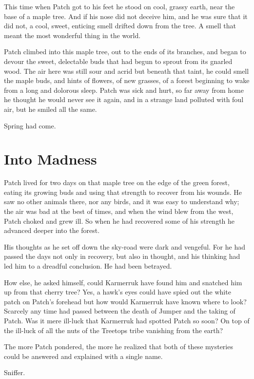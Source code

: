 \documentclass[12pt]{book}
\begin{document}
This time when Patch got to his feet he stood on cool, grassy earth, near the base of a maple tree. And if his nose did not deceive him, and he was sure that it did not, a cool, sweet, enticing smell drifted down from the tree. A smell that meant the most wonderful thing in the world.

Patch climbed into this maple tree, out to the ends of its branches, and began to devour the sweet, delectable buds that had begun to sprout from its gnarled wood. The air here was still sour and acrid %
but beneath that taint, he could smell the maple buds, and hints of flowers, of new grasses, of a forest beginning to wake from a long and dolorous sleep. Patch was sick and hurt, so far away from home he thought he would never see it again, and in a strange land polluted with foul air, but he smiled all the same.

Spring had come.


\section{Into Madness}

Patch lived for two days on that maple tree on the edge of the green forest, eating its growing buds and using that strength to recover from his wounds. He saw no other animals there, nor any birds, and it was easy to understand why; the air was bad at the best of times, and when the wind blew from the west, Patch choked and grew ill. So when he had recovered some of his strength he advanced deeper into the forest.

His thoughts as he set off down the sky-road were dark and vengeful. For he had passed the days not only in recovery, but also in thought, and his thinking had led him to a dreadful conclusion. He had been betrayed.

How else, he asked himself, could Karmerruk have found him and snatched him up from that cherry tree? Yes, a hawk's eyes could have spied out the white patch on Patch's forehead %
but how would Karmerruk have known where to look? Scarcely any time had passed between the death of Jumper and the taking of Patch. Was it mere ill-luck that Karmerruk had spotted Patch so soon? On top of the ill-luck of all the nuts of the Treetops tribe vanishing from the earth?

The more Patch pondered, the more he realized that both of these mysteries could be answered and explained with a single name.

Sniffer.
\end{document}
